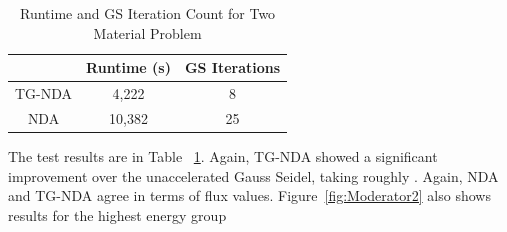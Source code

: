 \begin{table}[!htb]
\centering
\caption{Runtime and GS Iteration Count for Two Material Problem}
    \label{tab:two}
\begin{center}
    \begin{tabular}{|c|c|c|}
    \hline
    & Runtime (s) & GS Iterations \\
    \hline
    TG-NDA & 4,222 & 8 \\
    NDA & 10,382 & 25 \\
    \hline
    \end{tabular}
\end{center}
\end{table}

The test results are in Table ~\ref{tab:two}. Again, TG-NDA showed a significant improvement over the unaccelerated Gauss Seidel, taking roughly \DIFdelbegin {}\DIFdelend \DIFaddbegin {}\DIFaddend . Again, NDA and TG-NDA agree in terms of flux values. Figure~\ref{fig:Moderator2} also \DIFaddbegin {}\DIFaddend shows results for the highest energy group 
\DIFdelbegin {}%

